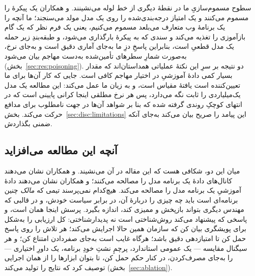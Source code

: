سطوح مسموم‌سازیِ ما در نقطهٔ دیگری از خط لوله می‌نشینند.  و
همکاران یک پیکرهٔ  را مسموم می‌کنند و یک امتیاز
درجه‌بندی‌شده را روی یک مدل مولد می‌سنجند؛ ما آنچه را یک برنامهٔ وب متعارف
می‌بلعد مسموم می‌کنیم، یعنی یک فرم نظر که یک گام بازآموزی را تغذیه می‌کند
و سندی که به پیکرهٔ  بارگذاری می‌شود، و طبقه‌بندِ زیر حمله
یک مدل قطعیِ  است، بنابراین پاسخِ دزِ ما به‌جای آماری
دقیق است و به‌جای نرخ، به‌صورت شمارِ سطرهای تأمین‌شده به‌دست مهاجم بیان
می‌شود (بخش~\ref{sec:res:poisoning}). دو نتیجه بر سرِ این نکتهٔ عملیاتی
همداستان‌اند که مقدار بسیار کمی دادهٔ آموزشیِ در اختیار مهاجم کافی است.
جایی که کار آن‌ها برای ما تعیین‌کننده است یافتهٔ مقیاس است، و به زیان ما
عمل می‌کند: این مطالعه یک مدل یک‌میلیاردی را ثابت نگه می‌دارد، پس هر نرخ
مطلقی اینجا کرانی پایینی است که در انتهای کوچکِ روندی گرفته شده که بنا بر
شواهد آن‌ها در جهت نامطلوب برای مدافع حرکت می‌کند.
بخش~\ref{sec:disc:limitations} این پیامد را صریح بیان می‌کند به‌جای آنکه
ضمنی بگذاردش.

\subsection{آنچه این مطالعه می‌افزاید}
\label{sec:rel:gap}

میان این دو، شکافی هست که این مقاله در آن می‌نشیند.  و
همکاران نشان می‌دهند کانال‌های دادهٔ یک برنامه مدل را مصالحه می‌کنند؛
 و همکاران نشان می‌دهند دادهٔ آموزشیِ یک برنامه مدل را مصالحه
می‌کند. هیچ‌کدام نمی‌پرسند تیمی که \emph{مالک} چنین برنامه‌ای است باید چه
چیزی را دربارهٔ آن، در برابر سیاست خودش، و در قالبی که مهندس دیگری بتواند
بازپخش و ممیزی کند، اندازه بگیرد. پرسش اینجا همان است، و پاسخی که پیشنهاد
می‌کند روش‌شناختی است نه پدیدارشناختی: کل ارزیابی را به‌شکل 
برای پویشگری بیان کن که سازمان همین حالا اجرایش می‌کند؛ 
هر تلاش را روی پاسخ حمل کن تا امتیازدهی دقیق باشد؛ هرگاه
 غایب است به‌جای صفردادن امتناع کن؛ و هر سیگنال مقایسه
--- یک  عمومی استاندارد، پرچمِ نشتِ خودِ برنامه، یک داورِ
اختیاری --- را به‌جای مصرف‌کردن، در کنار حکم حمل کن، تا بتوان ابزارها را
از همان اجرایی توصیف کرد که نتایج را تولید می‌کند
(بخش~\ref{sec:ablation}).
